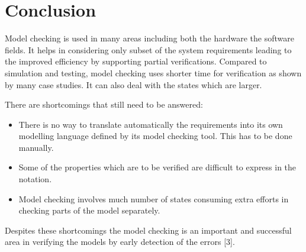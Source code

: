 \documentclass{article}
\begin{document}
\section{Conclusion}

Model checking is used in many areas including both the hardware the software fields. It helps in considering only subset of the system requirements leading to the improved efficiency by supporting partial verifications. Compared to simulation and testing, model checking uses shorter time for verification as shown by many case studies. It can also deal with the states which are larger. 


There are shortcomings that still need to be answered:
\begin{itemize}
\item There is no way to translate automatically the requirements into its own modelling language defined by its model checking tool. This has to be done manually.
\item Some of the properties which are to be verified are difficult to express in the notation.
\item Model checking involves much number of states consuming extra efforts in checking parts of the model separately. 
\end{itemize}
Despites these shortcomings the model checking is an important and successful area in verifying the models by early detection of the errors [3].
\end{document}
